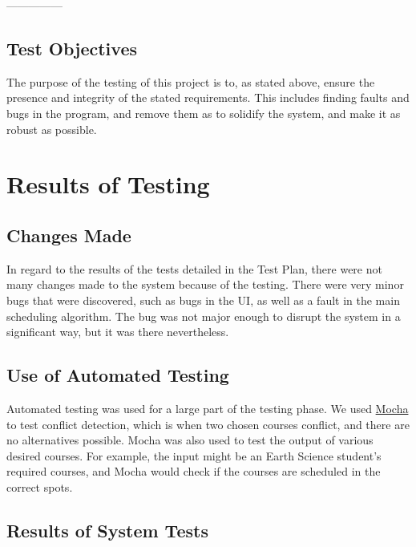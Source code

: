 \documentclass[11pt, oneside]{article}
\begin{document}
\noindent ---------------
\subsection{Test Objectives}
The purpose of the testing of this project is to, as stated above, ensure the presence and integrity of the stated requirements. This includes finding faults and bugs in the program, and remove them as to solidify the system, and make it as robust as possible.

\newpage

\section{Results of Testing}
\subsection{Changes Made}
In regard to the results of the tests detailed in the Test Plan, there were not many changes made to the system because of the testing. There were very minor bugs that were discovered, such as bugs in the UI, as well as a fault in the main scheduling algorithm. The bug was not major enough to disrupt the system in a significant way, but it was there nevertheless.

\subsection{Use of Automated Testing}
Automated testing was used for a large part of the testing phase. We used \href{http://mochajs.org}{Mocha} to test conflict detection, which is when two chosen courses conflict, and there are no alternatives possible. Mocha was also used to test the output of various desired courses. For example, the input might be an Earth Science student's required courses, and Mocha would check if the courses are scheduled in the correct spots.

\subsection{Results of System Tests}
\end{document}
